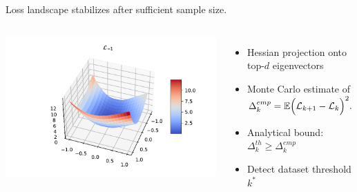 \documentclass{beamer}
\begin{document}
\begin{frame}{Loss landscape stabilizes after sufficient sample size.}
    \begin{columns}[c]
        \hspace{-1.5cm}
        \includegraphics[width=1.34\textwidth]{img/loss_eigen_-1_individ.pdf}
        \begin{itemize}
            \item Hessian projection onto top-$d$ eigenvectors
            \item Monte Carlo estimate of $\Delta_k^{emp} = \mathbb{E} \Bigl( \mathcal{L}_{k+1} - \mathcal{L}_{k} \Bigr)^2.$
            \item Analytical bound: $\Delta_k^{th} \ge \Delta_k^{emp}$
            \item Detect dataset threshold $k^*$
        \end{itemize}
    \end{columns}
\end{frame}
\end{document}
